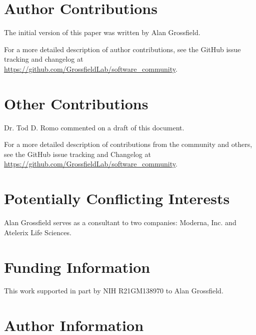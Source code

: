 \documentclass[9pt,training]{livecoms}
\newcommand{\githubrepository}{\url{https://github.com/GrossfieldLab/software_community}}
\begin{document}
\section{Author Contributions}
%
The initial version of this paper was written by Alan Grossfield.


For a more detailed description of author contributions,
see the GitHub issue tracking and changelog at \githubrepository.

\section{Other Contributions}
%
Dr. Tod D. Romo commented on a draft of this document.

For a more detailed description of contributions from the community and others, see the GitHub issue tracking and Changelog at \githubrepository.

\section{Potentially Conflicting Interests}

Alan Grossfield serves as a consultant to two companies: Moderna, Inc.
and Atelerix Life Sciences.

\section{Funding Information}
This work supported in part by NIH R21GM138970 to Alan Grossfield.

\section*{Author Information}
\makeorcid




\end{document}
